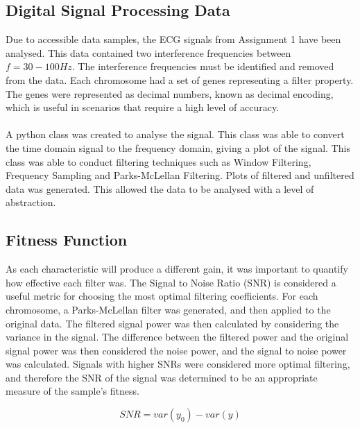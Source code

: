 \documentclass[a4paper, 11pt]{article}
\begin{document}
    \subsection{Digital Signal Processing Data}\label{sec:meth_sub1}
        Due to accessible data samples, the ECG signals from Assignment 1 have been analysed. This data contained
        two interference frequencies between  $f = 30 - 100Hz$. The interference frequencies must be identified and 
        removed from the data. \cite[]{Garip2018} Each chromosome had a set of genes representing a filter property. The genes were 
        represented as decimal numbers, known as decimal encoding, which is useful in scenarios that require a high
        level of accuracy. 
        \\\\
        A python class was created to analyse the signal. This class was able to convert the time domain signal to the
        frequency domain, giving a plot of the signal. This class was able to conduct filtering techniques such as Window
        Filtering, Frequency Sampling and Parks-McLellan Filtering. Plots of filtered and unfiltered data was generated. 
        This allowed the data to be analysed with a level of abstraction.

    \subsection{Fitness Function}\label{sec:meth_sub2}
        As each characteristic will produce a different gain, it was important to quantify how effective each filter was. 
        The Signal to Noise Ratio (SNR) is considered a useful metric for choosing the most optimal filtering coefficients. 
        For each chromosome, a Parks-McLellan filter was generated, and then applied to the original data. The filtered signal
        power was then calculated by considering the variance in the signal. The difference between the filtered power
        and the original signal power was then considered the noise power, and the signal to noise power was calculated. 
        Signals with higher SNRs were considered more optimal filtering, and therefore the SNR of the signal was determined
        to be an appropriate measure of the sample's fitness. 

        \begin{equation} SNR = var(y_{0}) - var(y)\end{equation}
\end{document}
